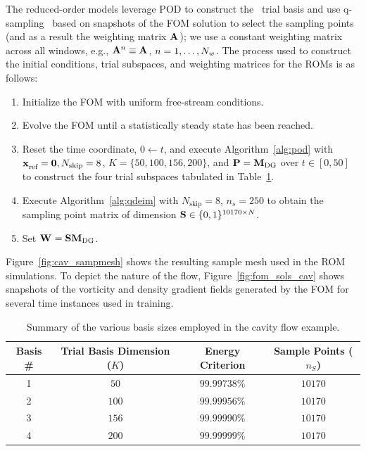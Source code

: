 The reduced-order models leverage POD to construct the \spatialAcronym\ trial basis and use q-sampling~\cite{qdeim_drmac} based on snapshots of the FOM solution to select the sampling points (and as a result the weighting 
matrix $\mathbf{A}^{}$); we use a constant weighting matrix across all windows, e.g., $\mathbf{A}^{n} \equiv \mathbf{A}^{}$, $n=1,\ldots,N_w$. The process used to construct the initial conditions, trial subspaces, and weighting matrices for the ROMs is as follows:
\begin{enumerate}
\item Initialize the FOM with uniform free-stream conditions.
\item Evolve the FOM until a statistically steady state has been reached.
\item Reset the time coordinate, $0 \leftarrow t$, and execute Algorithm~\ref{alg:pod} with $\mathbf{x}_\text{ref}^{} = \boldsymbol 0, N_{\text{skip}} = 8$, $K = \{50,100,156,200\}$, and $\mathbf{P} =  \mathbf{M}_{\text{DG}}$ over $t \in [0,50]$ to construct the four trial subspaces tabulated in Table~\ref{tab:rom_basis_details}. 
\item Execute Algorithm~\ref{alg:qdeim} with $N_{\text{skip}} = 8$, $n_s = 250$ to obtain the sampling point matrix of dimension $\mathbf{S} \in \{0,1\}^{10170 \times N }$.
\item Set $\mathbf{W}^{} = \mathbf{S} \mathbf{M}_{\text{DG}}$. 
\end{enumerate}
Figure~\ref{fig:cav_sampmesh} shows the resulting sample mesh used in the ROM simulations. To depict the nature of the flow, Figure~\ref{fig:fom_sols_cav} shows snapshots of the vorticity and density gradient fields generated by the FOM for several time instances used in training.  
\begin{table}[]
\begin{centering}
\begin{tabular}{c c c c}
\hline
Basis \# & Trial Basis Dimension ($K$) &  Energy Criterion & Sample Points ($n_S$) \\
\hline
1    & $50$ &  $99.99738\%$ & $10170$ \\
2    & $100$ & $99.99956\%$ & $10170$ \\
3    & $156$ & $99.99990\%$ & $10170$ \\
4    & $200$ & $99.99999\%$ & $10170$ \\
\hline
\end{tabular}
\caption{Summary of the various basis sizes employed in the cavity flow example.}
\label{tab:rom_basis_details}
\end{centering}
\end{table}

